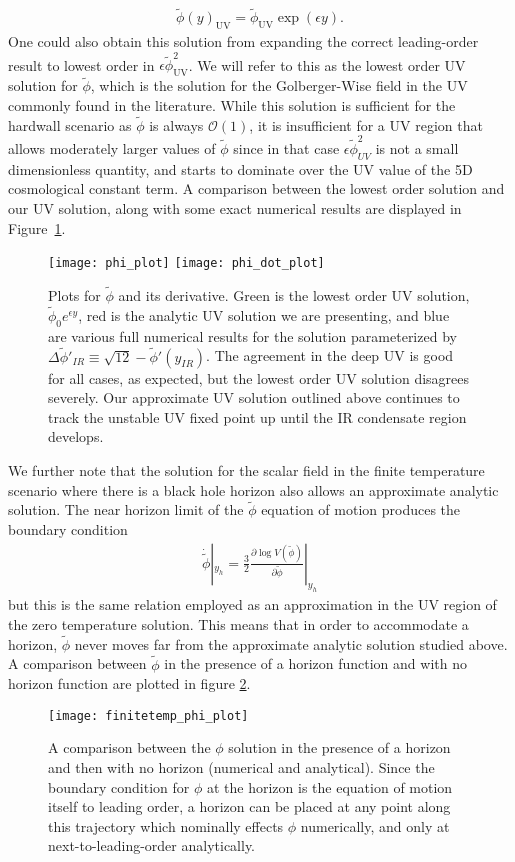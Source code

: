 \documentclass[12pt]{article}
\renewcommand{\tilde}{\widetilde} %
\newcommand{\beq}{\begin{eqnarray}}
\newcommand{\eeq}{\end{eqnarray}}
\begin{document}
\beq
\tilde{\phi} (y)_\text{UV} = \tilde{\phi}_\text{UV} \exp(\epsilon y ).
\eeq
One could also obtain this solution from expanding the correct leading-order result to lowest order in $  \epsilon \tilde{\phi}_\text{UV}^2 $. We will refer to this as the lowest order UV solution for $\tilde{\phi}$, which is the solution for the Golberger-Wise field in the UV commonly found in the literature. While this solution is sufficient for the hardwall scenario as $\tilde{\phi} $ is always $\mathcal{O}(1)$, it is insufficient for a UV region that allows moderately larger values of $\tilde{\phi}$ since in that case $\epsilon \tilde{\phi}_{UV}^2 $ is not a small dimensionless quantity, and starts to dominate over the UV value of the 5D cosmological constant term.  A comparison between the lowest order solution and our UV solution, along with some exact numerical results are displayed in Figure~\ref{fig:phi_plot}. 

\begin{figure}[h!]
	\center
	\texttt{[image: phi\_plot]}
	\texttt{[image: phi\_dot\_plot]}
	\caption{Plots for $\tilde{\phi}$  and its derivative. Green is the lowest order UV solution, $\tilde{\phi}_0 e^{\epsilon y} $, red is the analytic UV solution we are presenting, and blue are various full numerical results for the solution parameterized by $\Delta \tilde{\phi}'_{IR}  \equiv \sqrt{12}-  \tilde{\phi}'(y_{IR}) $. The agreement in the deep UV is good for all cases, as expected, but the lowest order UV solution disagrees severely.  Our approximate UV solution outlined above continues to track the unstable UV fixed point up until the IR condensate region develops. }
	\label{fig:phi_plot}
\end{figure}

We further note that the solution for the scalar field in the finite temperature scenario where there is a black hole horizon also allows an approximate analytic solution.  The near horizon limit of the $\tilde{\phi}$ equation of motion produces the boundary condition
\beq
\dot{\tilde{\phi}} |_{y_h}= \frac{3}{2 } \frac{\partial \log V (\tilde{\phi})}{\partial \tilde{\phi}} |_{y_h}
\eeq
but this is the same relation employed as an approximation in the UV region of the zero temperature solution.  This means that in order to accommodate a horizon, $\tilde{\phi}$ never moves far from the approximate analytic solution studied above.  A comparison between $\tilde{\phi}$ in the presence of a horizon function and with no horizon function are plotted in figure \ref{fig:phi_hor_plot}. 
\begin{figure}[h!]
	\center
	\texttt{[image: finitetemp\_phi\_plot]}
	\caption{A comparison between the $\phi$ solution in the presence of a horizon and then with no horizon (numerical and analytical).	Since the boundary condition for $\phi$ at the horizon is the equation of motion itself to leading order, a horizon can be placed at any point along this trajectory which nominally effects $\phi$ numerically, and only at next-to-leading-order analytically.}	\label{fig:phi_hor_plot}
\end{figure}
\end{document}
